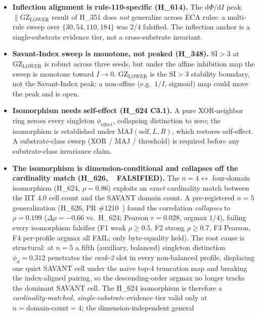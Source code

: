 \documentclass[11pt,a4paper]{article}
\providecommand{\tierRed}{🔴}
\newcommand{\GZL}{\mathrm{GZ_{LOWER}}}
\newcommand{\Svi}{\mathrm{SI}}
\begin{document}
\begin{itemize}\itemsep0.2em
\item \textbf{Inflection alignment is rule-110-specific (H\_614).} The
      $\mathrm{d}\Phi/\mathrm{d}I$ peak $\parallel \GZL$ result of H\_351
      does \emph{not} generalize across ECA rules: a multi-rule sweep over
      $\{30,54,110,184\}$ was 2/4 falsified. The inflection anchor is a
      single-substrate evidence tier, not a cross-substrate invariant.
\item \textbf{Savant-Index sweep is monotone, not peaked (H\_348).}
      $\Svi>3$ at $\GZL$ is robust across three seeds, but under the affine
      inhibition map the sweep is monotone toward $I\!\to\!0$. $\GZL$ is the
      $\Svi>3$ stability boundary, not the Savant-Index peak; a non-affine
      (e.g.\ $1/I$, sigmoid) map could move the peak and is open.
\item \textbf{Isomorphism needs self-effect (H\_624 C3.1).} A pure
      XOR-neighbor ring zeroes every singleton $\phi_{\mathrm{effect}}$,
      collapsing distinction to zero; the isomorphism is established under
      $\mathrm{MAJ}(\text{self},L,R)$, which restores self-effect. A
      substrate-class sweep (XOR / MAJ / threshold) is required before any
      substrate-class invariance claim.
\item \textbf{The isomorphism is dimension-conditional and collapses off
      the cardinality match (H\_626, \tierRed\ FALSIFIED).} The
      $n=4 \leftrightarrow$ four-domain isomorphism (H\_624, $\rho=0.86$)
      exploits an \emph{exact} cardinality match between the IIT 4.0 cell
      count and the SAVANT domain count. A pre-registered $n=5$
      generalization (H\_626, PR \#1210~\citep{anima_H626}) found the
      correlation \emph{collapses} to $\rho=0.199$ ($\Delta\rho=-0.66$
      vs.\ H\_624;
      Pearson $r=0.028$, argmax $1/4$), failing every isomorphism
      falsifier (F1 weak $\rho\!\ge\!0.5$, F2 strong $\rho\!\ge\!0.7$, F3
      Pearson, F4 per-profile argmax all FAIL; only byte-equality held).
      The root cause is structural: at $n=5$ a fifth (auxiliary,
      balanced) singleton distinction $\phi_d=0.312$ penetrates the
      \emph{rank-2} slot in every non-balanced profile, displacing one
      quiet SAVANT cell under the naive top-4 truncation map and breaking
      the index-aligned pairing, so the descending-order argmax no longer
      tracks the dominant SAVANT cell. The H\_624 isomorphism is therefore
      a \emph{cardinality-matched, single-substrate} evidence tier valid
      only at $n=\text{domain-count}=4$; the dimension-independent general

\end{itemize}
\end{document}
